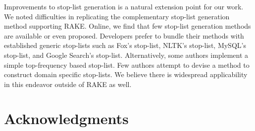 \documentclass[11pt,a4paper]{article}
\begin{document}
Improvements to stop-list generation is a natural extension point for our work. We noted difficulties in replicating the complementary stop-list generation method supporting RAKE. Online, we find that few stop-list generation methods are available or even proposed. Developers prefer to bundle their methods with established generic stop-lists such as Fox's stop-list, NLTK's stop-list, MySQL's stop-list, and Google Search's stop-list. Alternatively, some authors implement a simple top-frequency based stop-list. Few authors attempt to devise a method to construct domain specific stop-lists. We believe there is widespread applicability in this endeavor outside of RAKE as well.


\newpage
\section{Acknowledgments}
\end{document}
